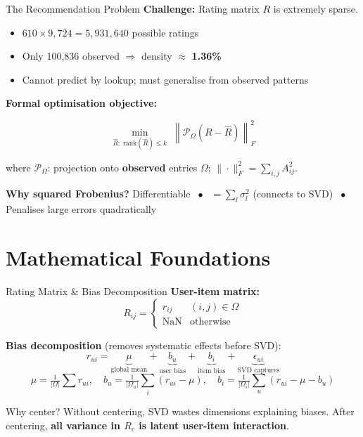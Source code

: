 \documentclass[10pt,t]{beamer}
\newcommand{\FroSq}[1]{\left\|#1\right\|_F^2}
\newcommand{\Om}{\Omega}
\begin{document}
\begin{frame}{The Recommendation Problem}
  \textbf{Challenge:} Rating matrix $R$ is extremely sparse.
  \begin{itemize}
    \item $610 \times 9{,}724 = 5{,}931{,}640$ possible ratings
    \item Only 100{,}836 observed $\Rightarrow$ density $\approx$ \textbf{1.36\%}
    \item Cannot predict by lookup; must generalise from observed patterns
  \end{itemize}

  \vspace{0.4em}
  \textbf{Formal optimisation objective:}
  \begin{block}{}
    \[
      \min_{\hat{R}:\;\mathrm{rank}(\hat{R})\leq k}\;
      \FroSq{\mathcal{P}_\Om(R - \hat{R})}
    \]
  \end{block}
  where $\mathcal{P}_\Om$: projection onto \textbf{observed} entries $\Om$;
  $\|\cdot\|_F^2 = \sum_{i,j}A_{ij}^2$.

  \vspace{0.3em}
  \textbf{Why squared Frobenius?}\;
  Differentiable $\;\bullet\;$
  $=\sum_l\sigma_l^2$ (connects to SVD) $\;\bullet\;$
  Penalises large errors quadratically
\end{frame}

\section{Mathematical Foundations}

\begin{frame}{Rating Matrix \& Bias Decomposition}
  \textbf{User-item matrix:}
  \[
    R_{ij} = \begin{cases} r_{ij} & (i,j)\in\Om \\ \mathrm{NaN} & \text{otherwise} \end{cases}
  \]

  \textbf{Bias decomposition} (removes systematic effects before SVD):
  \[
    r_{ui} = \underbrace{\mu}_{\text{global mean}}
           + \underbrace{b_u}_{\text{user bias}}
           + \underbrace{b_i}_{\text{item bias}}
           + \underbrace{\epsilon_{ui}}_{\text{SVD captures}}
  \]
  \[
    \mu = \tfrac{1}{|\Om|}\textstyle\sum r_{ui},\quad
    b_u = \tfrac{1}{|\Om_u|}\textstyle\sum_i(r_{ui}-\mu),\quad
    b_i = \tfrac{1}{|\Om_i|}\textstyle\sum_u(r_{ui}-\mu-b_u)
  \]

  \begin{alertblock}{Why center?}
    Without centering, SVD wastes dimensions explaining biases.
    After centering, \textbf{all variance in $R_c$ is latent user-item interaction}.
  \end{alertblock}
\end{frame}
\end{document}
